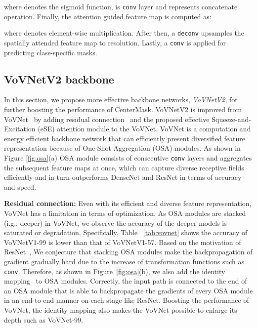 \documentclass[10pt,twocolumn,letterpaper]{article}
\begin{document}
\noindent
where  denotes the sigmoid function,  is  \texttt{conv} layer and  represents concatenate operation.
Finally, the attention guided feature map  is computed as:



\noindent
where  denotes element-wise multiplication. After then, a  \texttt{deconv} upsamples the spatially attended feature map to  resolution. Lastly, a  \texttt{conv} is applied for predicting class-specific masks.


\subsection{VoVNetV2 backbone}
In this section, we propose more effective backbone networks, \textit{VoVNetV2}, for further boosting the performance of CenterMask.
VoVNetV2 is improved from VoVNet~\cite{lee2019energy} by adding residual connection~\cite{he2016deep} and the proposed effective Squeeze-and-Excitation (eSE) attention module to the VoVNet.
VoVNet is a computation and energy efficient backbone network that can efficiently present diversified feature representation because of One-Shot Aggregation (OSA) modules. 
As shown in Figure \ref{fig:osa}(a) OSA module consists of consecutive \texttt{conv} layers and aggregates the subsequent feature maps at once, which can capture diverse receptive fields efficiently and in turn outperforms DenseNet and ResNet in terms of accuracy and speed.



\noindent
\textbf{Residual connection:} Even with its efficient and diverse feature representation, VoVNet has a limitation in terms of optimization.  
As OSA modules are stacked (i.g., deeper) in VoVNet, we observe the accuracy of the deeper models is saturated or degradation.
Specifically, Table ~\ref{tab:vovnet} shows the accuracy of VoVNetV1-99 is lower than that of VoVNetV1-57.
Based on the motivation of ResNet~\cite{he2016deep}, We conjecture that stacking OSA modules make the backpropagation of gradient gradually hard due to the increase of transformation functions such as \texttt{conv}.
Therefore, as shown in Figure~\ref{fig:osa}(b), we also add the identity mapping~\cite{he2016deep} to OSA modules.
Correctly, the input path is connected to the end of an OSA module that is able to backpropagate the gradients of every OSA module in an end-to-end manner on each stage like ResNet.
Boosting the performance of VoVNet, the identity mapping also makes the VoVNet possible to enlarge its depth such as VoVNet-99.
\end{document}
